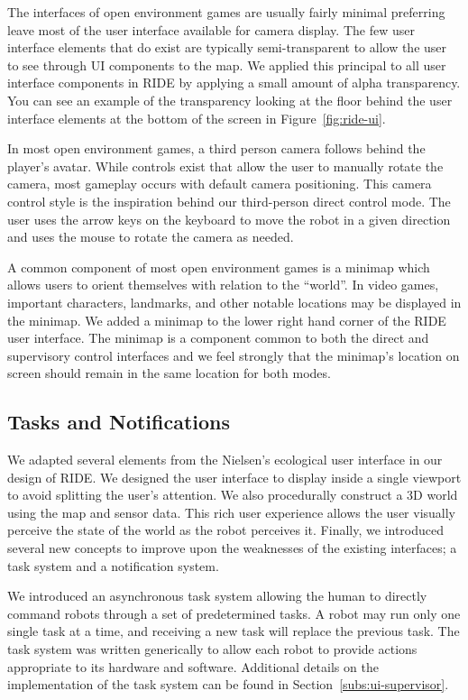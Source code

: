 The interfaces of open environment games are usually fairly minimal preferring leave most of the user interface available for camera display. The few user interface elements that do exist are typically semi-transparent to allow the user to see through UI components to the map. We applied this principal to all user interface components in RIDE by applying a small amount of alpha transparency. You can see an example of the transparency looking at the floor behind the user interface elements at the bottom of the screen in Figure~\ref{fig:ride-ui}.

In most open environment games, a third person camera follows behind the player's avatar. While controls exist that allow the user to manually rotate the camera, most gameplay occurs with default camera positioning. This camera control style is the inspiration behind our third-person direct control mode. The user uses the arrow keys on the keyboard to move the robot in a given direction and uses the mouse to rotate the camera as needed.

A common component of most open environment games is a minimap which allows users to orient themselves with relation to the ``world''. In video games, important characters, landmarks, and other notable locations may be displayed in the minimap. We added a minimap to the lower right hand corner of the RIDE user interface. The minimap is a component common to both the direct and supervisory control interfaces and we feel strongly that the minimap's location on screen should remain in the same location for both modes.

\subsection{Tasks and Notifications}
We adapted several elements from the Nielsen's ecological user interface in our design of RIDE. We designed the user interface to display inside a single viewport to avoid splitting the user's attention. We also procedurally construct a 3D world using the map and sensor data. This rich user experience allows the user visually perceive the state of the world as the robot perceives it. Finally, we introduced several new concepts to improve upon the weaknesses of the existing interfaces; a task system and a notification system.

We introduced an asynchronous task system allowing the human to directly command robots through a set of predetermined tasks. A robot may run only one single task at a time, and receiving a new task will replace the previous task. The task system was written generically to allow each robot to provide actions appropriate to its hardware and software. Additional details on the implementation of the task system can be found in Section~\ref{subs:ui-supervisor}.

